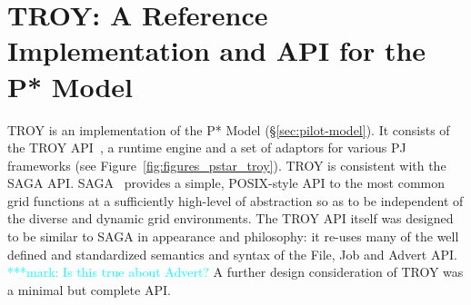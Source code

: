 \documentclass[conference,final]{IEEEtran}
\newcommand{\terminology}[1]{ {\textcolor{red} {(Terminology used: \textbf{#1}) }}}
\newcommand{\jhanote}[1]{ {\textcolor{red} { ***shantenu: #1 }}}
\newcommand{\alnote}[1]{ {\textcolor{blue} { ***andre: #1 }}}
\newcommand{\amnote}[1]{ {\textcolor{blue} { ***andre2: #1 }}}
\newcommand{\msnote}[1]{ {\textcolor{cyan} { ***mark: #1 }}}
\newcommand{\terminology}[1]{}
\newcommand{\alnote}[1]{}
\newcommand{\amnote}[1]{}
\newcommand{\jhanote}[1]{}
\newcommand{\msnote}[1]{}
\newcommand{\upp}{\vspace*{-0.5em}}
\begin{document}
\section{TROY: A Reference Implementation and API for the P*
  Model\upp\upp}






TROY is an implementation of the P* Model
(\S\ref{sec:pilot-model}). It consists of the TROY API~\cite{troy_api}, a
runtime engine and a set of adaptors for various PJ frameworks (see
Figure~\ref{fig:figures_pstar_troy}). TROY is consistent with the SAGA
API. SAGA~\cite{saga_url,saga_gfd90} provides a simple, POSIX-style
API to the most common grid functions at a sufficiently high-level of
abstraction so as to be independent of the diverse and dynamic grid
environments. The TROY API itself was designed to be similar to SAGA
in appearance and philosophy: it re-uses many of the well defined and
standardized semantics and syntax of the File, Job and Advert API.
\msnote{Is this true about Advert?} A further design consideration of
TROY was a minimal but complete API.

\end{document}
